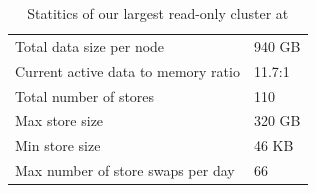 \begin{table}
\begin{center}
	\begin{tabular} { | l | l | }
	\hline
	Total data size per node &	940 GB			\\ 
	Current active data to memory ratio &	11.7:1		\\
	\hline
	Total number of stores &	110 	\\
	Max store size  &		320 GB	\\
	Min store size &		46 KB	\\
	Max number of store swaps per day & 66	\\
	\hline
	\end{tabular}
\end{center}
	\caption{Statitics of our largest read-only cluster at \linkedin{}}
 	\label{tab:production_statistics}
\end{table}


